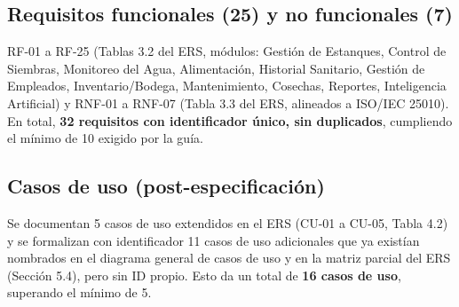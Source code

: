 \documentclass[11pt,a4paper]{article}
\begin{document}
\subsection{Requisitos funcionales (25) y no funcionales (7)}
RF-01 a RF-25 (Tablas 3.2 del ERS, módulos: Gestión de Estanques, Control de Siembras, Monitoreo del Agua, Alimentación, Historial Sanitario, Gestión de Empleados, Inventario/Bodega, Mantenimiento, Cosechas, Reportes, Inteligencia Artificial) y RNF-01 a RNF-07 (Tabla 3.3 del ERS, alineados a ISO/IEC 25010). En total, \textbf{32 requisitos con identificador único, sin duplicados}, cumpliendo el mínimo de 10 exigido por la guía.

\subsection{Casos de uso (post-especificación)}
Se documentan 5 casos de uso extendidos en el ERS (CU-01 a CU-05, Tabla 4.2) y se formalizan con identificador 11 casos de uso adicionales que ya existían nombrados en el diagrama general de casos de uso y en la matriz parcial del ERS (Sección 5.4), pero sin ID propio. Esto da un total de \textbf{16 casos de uso}, superando el mínimo de 5.
\end{document}
